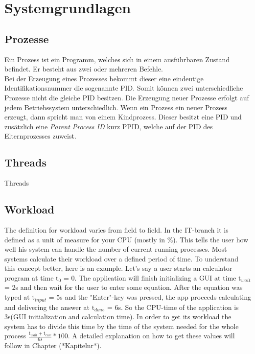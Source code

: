 \chapter{Systemgrundlagen}
\section{Prozesse}
Ein Prozess ist ein Programm, welches sich in einem ausf\"uhrbaren Zustand befindet. Er besteht aus zwei oder mehreren Befehle.\\
Bei der Erzeugung eines Prozesses bekommt dieser eine eindeutige Identifikationsnummer die sogenannte PID. Somit k\"onnen zwei unterschiedliche Prozesse nicht die gleiche PID besitzen. Die Erzeugung neuer Prozesse erfolgt auf jedem Betriebssystem unterschiedlich. Wenn ein Prozess ein neuer Prozess erzeugt, dann spricht man von einem Kindprozess.
Dieser besitzt eine PID und zus\"atzlich eine \textit{Parent Process ID} kurz PPID, welche auf der PID des Elternprozesses zuweist.\\



\section{Threads}
Threads 
\section{Workload}
The definition for workload varies from field to field. In the IT-branch it is defined as a unit of measure for your CPU (mostly in \%). This tells the user how well his system can handle the number of current running processes. Most systems calculate their workload over a defined period of time. To understand this concept better, here is an example. Let's say a user starts an calculator program at time $\mathrm{t}_0$ = 0. The application will finish initializing a GUI at time $\mathrm{t}_{wait}$ = 2s and then wait for the user to enter some equation.
After the equation was typed at $\mathrm{t}_{input}$ = 5s and the "Enter"-key was pressed, the app proceeds calculating and delivering the answer at $\mathrm{t}_{done}$ = 6s. So the CPU-time of the application is 3s(GUI initialization and calculation time). In order to get its workload the system has to divide this time by the time of the system needed for the whole process $\frac{\mathrm{t}_{wait}+\mathrm{t}_{calc}}{6s}*100$.
A detailed explanation on how to get these values will follow in Chapter (*Kapitelnr*).